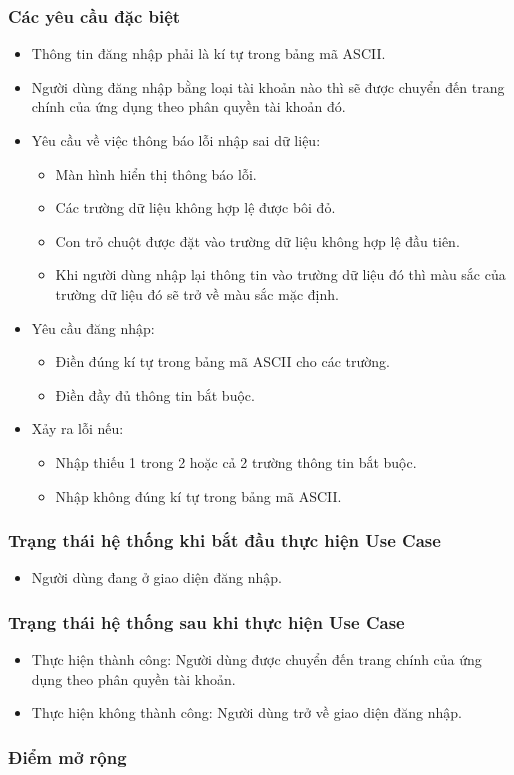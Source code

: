\subsubsection{Các yêu cầu đặc biệt}
\begin{itemize}
    \item Thông tin đăng nhập phải là kí tự trong bảng mã ASCII.
    \item Người dùng đăng nhập bằng loại tài khoản nào thì sẽ được chuyển đến trang chính của ứng dụng theo phân quyền tài khoản đó.
    \item Yêu cầu về việc thông báo lỗi nhập sai dữ liệu:
    \begin{itemize}
        \item Màn hình hiển thị thông báo lỗi.
        \item Các trường dữ liệu không hợp lệ được bôi đỏ.
        \item Con trỏ chuột được đặt vào trường dữ liệu không hợp lệ đầu tiên.
        \item Khi người dùng nhập lại thông tin vào trường dữ liệu đó thì màu sắc của trường dữ liệu đó sẽ trở về màu sắc mặc định.
    \end{itemize}
    \item Yêu cầu đăng nhập:
    \begin{itemize}
        \item Điền đúng kí tự trong bảng mã ASCII cho các trường.
        \item Điền đầy đủ thông tin bắt buộc.
    \end{itemize}
    \item Xảy ra lỗi nếu:
    \begin{itemize}
        \item Nhập thiếu 1 trong 2 hoặc cả 2 trường thông tin bắt buộc.
        \item Nhập không đúng kí tự trong bảng mã ASCII.
    \end{itemize}
\end{itemize}

\subsubsection{Trạng thái hệ thống khi bắt đầu thực hiện Use Case}
\begin{itemize}
    \item Người dùng đang ở giao diện đăng nhập.
\end{itemize}

\subsubsection{Trạng thái hệ thống sau khi thực hiện Use Case}
\begin{itemize}
    \item Thực hiện thành công: Người dùng được chuyển đến trang chính của ứng dụng theo phân quyền tài khoản.
    \item Thực hiện không thành công: Người dùng trở về giao diện đăng nhập.
\end{itemize}

\subsubsection{Điểm mở rộng}